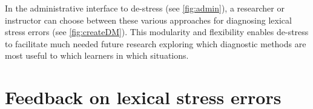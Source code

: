 \documentclass[11pt,a4paper,onecolumn]{article}
\newcommand{\TODO}[1]{{\color{red}\textbf{[TODO #1]}}}
\begin{document}
	
	In the administrative interface to de-stress (see \cref{fig:admin}), a researcher or instructor can choose between these various approaches for diagnosing lexical stress errors (see \cref{fig:createDM}).
	This modularity and flexibility enables de-stress to facilitate much needed future research  exploring which diagnostic methods are most useful to which learners in which situations. %

\section{Feedback on lexical stress errors}
\end{document}
